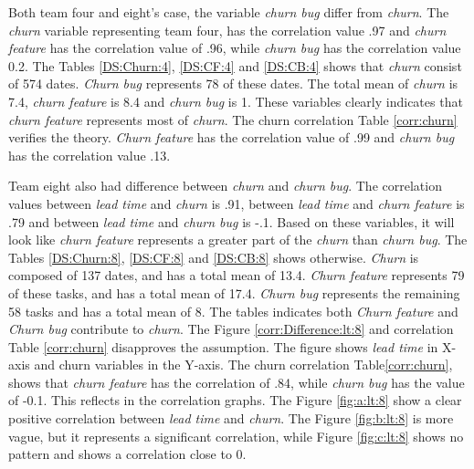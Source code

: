 \documentclass[UKenglish]{ifimaster}  %
\begin{document}
Both team four and eight's case, the variable \textit{churn bug} differ from \textit{churn}. The \textit{churn} variable representing team four, has the correlation value .97 and \textit{churn feature} has the correlation value of .96, while \textit{churn bug} has the correlation value 0.2. The Tables \ref{DS:Churn:4}, \ref{DS:CF:4} and \ref{DS:CB:4} shows that \textit{churn} consist of 574 dates. \textit{Churn bug} represents 78 of these dates. The total mean of \textit{churn} is 7.4, \textit{churn feature} is 8.4 and \textit{churn bug} is 1. These variables clearly indicates that \textit{churn feature} represents most of \textit{churn}. The churn correlation Table \ref{corr:churn} verifies the theory. \textit{Churn feature} has the correlation value of .99 and \textit{churn bug} has the correlation value .13.


Team eight also had difference between \textit{churn} and \textit{churn bug}. The correlation values between \textit{lead time} and \textit{churn} is .91, between \textit{lead time} and \textit{churn feature} is .79 and between \textit{lead time} and \textit{churn bug} is  -.1. Based on these variables, it will look like \textit{churn feature} represents a greater part of the \textit{churn} than \textit{churn bug}. The Tables \ref{DS:Churn:8}, \ref{DS:CF:8} and \ref{DS:CB:8} shows otherwise. \textit{Churn} is composed of 137 dates, and has a total mean of 13.4. \textit{Churn feature} represents 79 of these tasks, and has a total mean of 17.4. \textit{Churn bug} represents the remaining 58 tasks and has a total mean of 8.  The tables indicates both \textit{Churn feature} and \textit{Churn bug} contribute to \textit{churn}. The Figure \ref{corr:Difference:lt:8} and correlation Table \ref{corr:churn} disapproves the assumption. The figure shows \textit{lead time} in X-axis and churn variables in the Y-axis. The churn correlation Table\ref{corr:churn}, shows that \textit{churn feature} has the correlation of .84, while \textit{churn bug} has the value of -0.1. This reflects in the correlation graphs. The Figure \ref{fig:a:lt:8} show a clear positive correlation between  \textit{lead time} and  \textit{churn}. The Figure \ref{fig:b:lt:8} is more vague, but it represents a significant correlation, while Figure \ref{fig:c:lt:8} shows no pattern and shows a correlation close to 0.  
\end{document}
